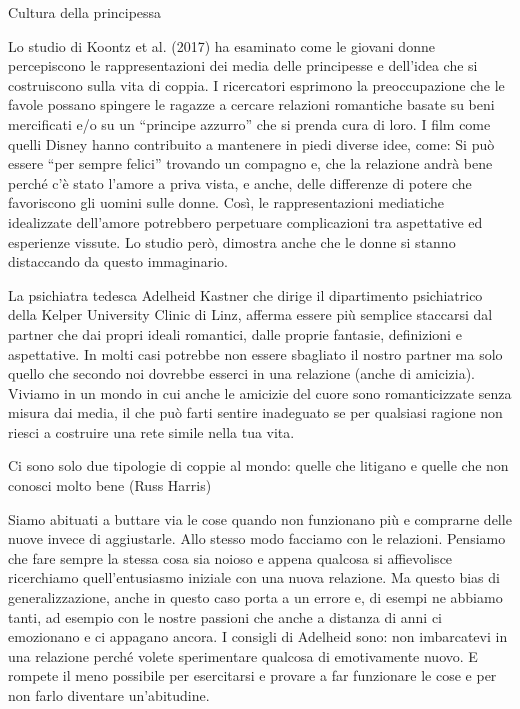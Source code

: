 \documentclass[12pt]{book} %
\begin{document}
\begin{mdframed}[linewidth=1pt]
Cultura della principessa

Lo studio di Koontz et al. (2017) ha esaminato
come le giovani donne percepiscono le rappresentazioni dei media delle principesse e dell'idea che
si costruiscono sulla vita di coppia. I ricercatori esprimono la preoccupazione che le favole possano spingere le
ragazze a cercare relazioni romantiche basate su beni mercificati e/o su un “principe azzurro” che si prenda cura di
loro. I film come quelli Disney hanno contribuito a mantenere in piedi diverse idee, come: Si può essere “per sempre
felici” trovando un compagno e, che la relazione andrà bene perché c'è stato
l'amore a priva vista, e anche, delle differenze di potere che favoriscono gli uomini sulle donne.
Così, le rappresentazioni mediatiche idealizzate dell'amore potrebbero perpetuare complicazioni
tra aspettative ed esperienze vissute. Lo studio però, dimostra anche che le donne si stanno distaccando da questo
immaginario.
\end{mdframed}

\bigskip

La psichiatra tedesca Adelheid Kastner che dirige il dipartimento psichiatrico della Kelper University Clinic di Linz,
afferma essere più semplice staccarsi dal partner che dai propri ideali romantici, dalle proprie fantasie, definizioni
e aspettative. In molti casi potrebbe non essere sbagliato il nostro partner ma solo quello che secondo noi dovrebbe
esserci in una relazione (anche di amicizia). Viviamo in un mondo in cui anche le
amicizie del cuore sono romanticizzate senza misura dai media, il che può farti sentire inadeguato se per qualsiasi
ragione non riesci a costruire una rete simile nella tua vita. 

\bigskip

Ci sono solo due tipologie di coppie al mondo: quelle che litigano e quelle che non conosci molto bene (Russ Harris)

\bigskip

Siamo abituati a buttare via le cose quando non funzionano più e comprarne delle nuove invece di aggiustarle. Allo
stesso modo facciamo con le relazioni. Pensiamo che fare sempre la stessa cosa sia noioso e appena qualcosa si
affievolisce ricerchiamo quell'entusiasmo iniziale con una nuova relazione. Ma questo bias di
generalizzazione, anche in questo caso porta a un errore e, di esempi ne abbiamo tanti, ad esempio con le nostre
passioni che anche a distanza di anni ci emozionano e ci appagano ancora. I consigli di Adelheid sono: non imbarcatevi
in una relazione perché volete sperimentare qualcosa di emotivamente nuovo. E rompete il meno possibile per esercitarsi
e provare a far funzionare le cose e per non farlo diventare
un'abitudine.
\end{document}
